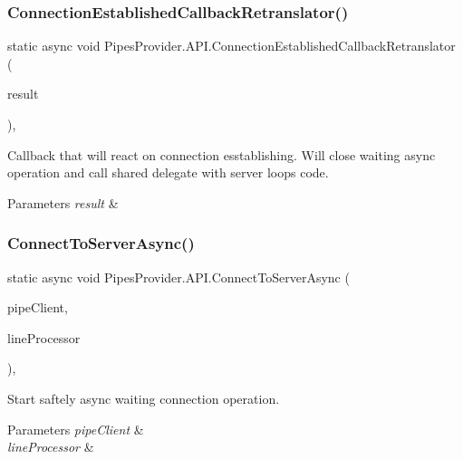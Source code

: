 \subsubsection{\texorpdfstring{Connection\+Established\+Callback\+Retranslator()}{ConnectionEstablishedCallbackRetranslator()}}
{\footnotesize\ttfamily static async void Pipes\+Provider.\+A\+P\+I.\+Connection\+Established\+Callback\+Retranslator (\begin{DoxyParamCaption}\item[{I\+Async\+Result}]{result }\end{DoxyParamCaption})\hspace{0.3cm}{\ttfamily [static]}, {\ttfamily [private]}}



Callback that will react on connection esstablishing. Will close waiting async operation and call shared delegate with server loop\textquotesingle{}s code. 


\begin{DoxyParams}{Parameters}
{\em result} & \\
\hline
\end{DoxyParams}
\mbox{\label{class_pipes_provider_1_1_a_p_i_a5314727d43f5fafc8630dbc814cebeac}} 
\subsubsection{\texorpdfstring{Connect\+To\+Server\+Async()}{ConnectToServerAsync()}}
{\footnotesize\ttfamily static async void Pipes\+Provider.\+A\+P\+I.\+Connect\+To\+Server\+Async (\begin{DoxyParamCaption}\item[{Named\+Pipe\+Client\+Stream}]{pipe\+Client,  }\item[{\mbox{\hyperlink{class_pipes_provider_1_1_transmission_line}{Transmission\+Line}}}]{line\+Processor }\end{DoxyParamCaption})\hspace{0.3cm}{\ttfamily [static]}, {\ttfamily [private]}}



Start saftely async waiting connection operation. 


\begin{DoxyParams}{Parameters}
{\em pipe\+Client} & \\
\hline
{\em line\+Processor} & \\
\hline
\end{DoxyParams}
\mbox{\label{class_pipes_provider_1_1_a_p_i_a90278e985fdf5488b1a60787fa1ff5ac}} 
